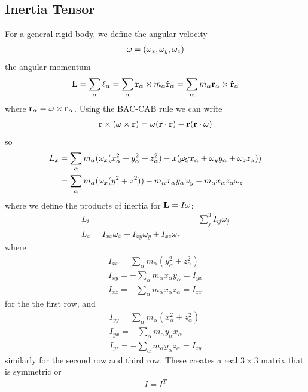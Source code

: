 \documentclass[../main.tex]{subfiles}
\begin{document}
\subsection*{Inertia Tensor}
For a general rigid body, we define the angular velocity
\begin{align*}
    \vb \omega = (\omega_x, \omega_y, \omega_z) 
\end{align*}
the angular momentum
\begin{align*}
    \vb L = \sum_\alpha \vb \ell_\alpha = \sum_\alpha \vb r_\alpha \times m_\alpha \dot{\vb r}_\alpha 
        = \sum_\alpha m_\alpha \vb r_\alpha \times \dot{\vb r}_\alpha 
\end{align*}
where $\dot{\vb r}_\alpha = \vb \omega \times \vb r_\alpha$. Using the BAC-CAB rule we can write
\begin{align*}
    \vb r \times (\vb \omega \times \vb r) = \vb \omega(\vb r \cdot \vb r) - \vb r(\vb r \cdot \vb \omega)
\end{align*}
so
\begin{align*}
    L_x &= \sum_\alpha m_\alpha(\omega_x (x_\alpha^2 + y_\alpha^2+ z_\alpha^2) 
    - x(\cancel{\omega_x} x_\alpha + \omega_y y_\alpha + \omega_z z_\alpha)) \\
    &= \sum_\alpha m_\alpha(\omega_x(y^2 + z^2)) - m_\alpha x_\alpha y_\alpha \omega_y 
        - m_\alpha x_\alpha z_\alpha \omega_z
\end{align*}
where we define the products of inertia for $\vb L = I \vb \omega$:
\begin{align*}
    L_i &= \sum_j^3 I_{ij} \omega_j \\
    L_x = I_{xx} \omega_x + I_{xy} \omega_y + I_{xz} \omega_z
\end{align*}
where
\begin{align*}
    I_{xx} = \sum_\alpha m_\alpha(y_\alpha^2 + z_\alpha^2) \\
    I_{xy} = -\sum_\alpha m_\alpha x_\alpha y_\alpha = I_{yx} \\
    I_{xz} = -\sum_\alpha m_\alpha x_\alpha z_\alpha = I_{zx}
\end{align*}
for the the first row, and
\begin{align*}
    I_{yy} = \sum_\alpha m_\alpha(x_\alpha^2 + z_\alpha^2) \\
    I_{yx} = -\sum_\alpha m_\alpha y_\alpha x_\alpha \\
    I_{yz} = -\sum_\alpha m_\alpha y_\alpha z_\alpha = I_{zy}
\end{align*}
similarly for the second row and third row. These creates a real $3 \times 3$ matrix that is 
symmetric or
\begin{align*}
    I = I^T
\end{align*}
\end{document}
